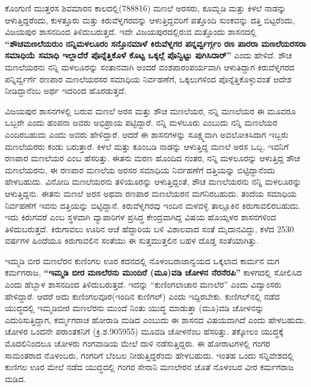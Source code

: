 ಕೊಂಗುಣಿ ಮುತ್ತರಸ ಶಿವಮಾರನ ಕಾಲದಲ್ಲಿ(788\enginline{-}816) ಮಣಲೆ ಅರಸರು, ಕೂಮ್ಬಡಿ ಮತ್ತು ಕಿಳಲೆ ನಾಡನ್ನು ಆಳುತ್ತಿದ್ದರೆಂದು, ಕುಳತ್ತೂರು ಮತ್ತು ಕಿರುವೆಳ್ನಗರವನ್ನು ಆಳುತ್ತಿದ್ದವರಿಗೆ ಪತ್ತೊಂದಿ ಸುಂಕವನ್ನು ದತ್ತಿ ಬಿಟ್ಟರೆಂದು, ವಿಜಯಪುರ ಶಾಸನದಿಂದ ತಿಳಿದುಬರುತ್ತದೆ. ಇದೇ ವಿಜಯಪುರದಲ್ಲಿರುವ ಮತ್ತೊಂದು ಶಾಸನದಲ್ಲಿ \textbf{“ಶೌಚಮಣಲೆಯರುಂ\general{\break } ನನ್ನಿಮಳಲೂರಂ ಸನ್ತೊನಮಾಳೆ ಕಿರುವೆಳ್ನಗರ ಪನ್ನರ್ವ್ವರ್ಗ್ಗಂ ರಣ ಪಾರರಾ ಮಣಲೆಯರಸರಾ ಸಮಾಧಿಯೆ ಸಮಾಧಿ ಇಲ್ಲಾದೆರೆ ಪೊನ್ನೆತ್ತಿಕೊಳೆ ಕೊಟ್ಟ ಒಕ್ಕಲ್ಗೆ ಪೊನ್ವಿಟ್ಟು ಪುಗಿಸಿದಾರ್​”} ಎಂದು ಹೇಳಿದೆ. ಶೌಚ ಮಣಲೆಯರನು ನನ್ನಿ ಮಳಲೂರನ್ನು ಸಂತಾನವಾಗಿ ಅಂದರೆ ವಂಶಪಾರಂಪರ್ಯವಾಗಿ ಆಳುತಿದ್ದಾಗ ಕಿರುವೆಳ್ನಗರದ ಪನ್ನಿರ್ವ್ವರ್ಗೆ ರಣಪಾರ ಮಣಲೆಯರಸರ ಸಮಾಧಿಯ ನಿರ್ವಹಣೆಗೆ, ಒಕ್ಕಲುಗಳಿಂದ ಪೊನ್ನೆತ್ತಿಕೊಳ್ಳುವಂತೆ ಆದೇಶ ನೀಡಿದ್ದಾನೆಂಬ ಅರ್ಥ ಇದರಿಂದ ಹೊರಡುತ್ತದೆ.

ವಿಜಯಪುರ ಶಾಸನಗಳಲ್ಲಿ ಬರುವ ಮಣಲೆ ಅರಸ ಮತ್ತು ಶೌಚ ಮಣಲೆಯರ, ನನ್ನಿ ಮಣಲೆಯರ ಈ ಮೂವರೂ ಒಬ್ಬರೇ ಎಂದು ಹಂಪನಾ ಅವರು ಅಭಿಪ್ರಾಯ ಪಟ್ಟಿದ್ದಾರೆ. ನನ್ನಿ ಮಳಲೂರು ಎಂಬುದು ನನ್ನಿ ಮಣಲೆಯರ ಎಂದಿರಬಹುದು ಎಂದು ಅವರು ಹೇಳಿದ್ದಾರೆ. ಆದರೆ ಈ ಶಾಸನಗಳನ್ನು ಸೂಕ್ಷ್ಮವಾಗಿ ಅವಲೋಕಿಸಿದಾಗ ಇಬ್ಬರು ಮಣಲೆಯರರು ಕಂಡು ಬರುತ್ತಾರೆ. ಕಿಳಲೆ ಮತ್ತು ಕೂಂಬಡಿ ನಾಡನ್ನು ಆಳುತ್ತಿದ್ದ ಮಣಲೆ ಅರಸ ಒಬ್ಬ. ಇವನಿಗೆ ರಣಪಾರ ಮಣಲೆಯರ ಎಂಬ ಹೆಸರಿತ್ತು. ಈತನು ಮರಣ ಹೊಂದಿದ ನಂತರ, ನನ್ನಿ ಮಳಲೂರನ್ನು ಆಳುತ್ತಿದ್ದ ಶೌಚ ಮಣಲೆಯರನು, ಈ ರಣಪಾರ ಮಣಲೆಯ ಅರಸರ ಸಮಾಧಿಯ ನಿರ್ವಹಣೆಗೆ ದತ್ತಿಯನ್ನು ಬಿಟ್ಟಿದ್ದಾನೆಂದು ಹೇಳಬಹುದು. ವಿನೋದಿ ಮಣಲೆಯರನು ತಳಿಯೂರನ್ನು ಆಳುತ್ತಿದ್ದಂತೆ, ಶೌಚ ಮಣಲೆಯರನು ನನ್ನಿ ಮಳಲೂರನ್ನು ಆಳುತ್ತಿದ್ದನು. ಈತನು ಮಣಲೆ ಅರಸ ಅಥವಾ ರಣಪಾರ ಮಣಲೆಯರನ ಮಗನಿರಬಹುದು. ತಂದೆಯ ಸಮಾಧಿಯ ನಿರ್ವಹಣೆಗೆ ಇವನು ದತ್ತಿಯನ್ನು ಬಿಟ್ಟಿದ್ದಾನೆ. ಕಿರುವೆಳ್ನಗರವು ಇಂದಿನ ಮಳವಳ್ಳಿ ತಾಲ್ಲೂಕಿನ ಕಿರುಗಾವಲಿರಬಹುದು. ಇದು ಕಿರುಗವರೆ ಎಂಬ ಸ್ಥಳವಾಗಿ ವ್ಯಾಪಾರಿಗಳ ಪ್ರಸಿದ್ಧ ಕೇಂದ್ರವಾಗಿದ್ದ ವಿಷಯ ಹೊಯ್ಸಳರ ಶಾಸನಗಳಿಂದ ತಿಳಿದುಬರುತ್ತದೆ. ಕಿರುಗಾವಲು ಊರಿನ ಆಚೆ ಹೆದ್ದಾರಿಯ ಬಳಿ ವಿಶಾಲವಾದ ಸಂತೆ ಮೈದಾನವಿದ್ದು, ಕಳೆದ 25\enginline{-}30 ವರ್ಷಗಳ ಹಿಂದೆಯೂ ಕಿರುಗಾವಲಿನ ಸಂತೆಯು ಈ ಸುತ್ತಮುತ್ತಲಿನ ಬಹಳ ದೊಡ್ಡ ಸಂತೆಯಾಗಿತ್ತು.

ಇಮ್ಮಡಿ ಬೀರ ಮಣಲೆರನ ಕುಣಿಂಗಲ ಊರ ಕದನದಲ್ಲಿ ನೊಳಂಬರಾಜಾನ್ವಯದ ಒಕ್ಕಲಾದ ಕಾರ್ಮನ ಮಗ ಕರ್ಮಗರಾಜ, \textbf{“ಇಮ್ಮಡಿ ಬೀರ ಮಣಲೆರನು ಮುಂದಿರೆ (ಮೂ)ವಡಿ ಚೋಳನ ನೆರನೆರಪಿ”} ಕಾಳಗದಲ್ಲಿ ಸೋಲಿಸಿದ ಎಂದು ಹೆಬ್ಬಾಳ ಶಾಸನದಿಂದ ತಿಳಿದುಬರುತ್ತದೆ. ಇದನ್ನು “ಕುಣಿಂಗಲಾಚಾರ ಮಣಲೆರ” ಎಂದು ವಿದ್ವಾಂಸರು ಹೇಳಿದ್ದಾರೆ. ಆದರೆ ಅದು ಕುಣಿಂಗಲವೂರ(ಇಂದಿನ ಕುಣಿಗಲ್​) ಎಂದು ಇದ್ದಿರಬೇಕು. ಕುಣಿಗಲ್​ನಲ್ಲಿ ನಡೆದ ಯುದ್ಧದಲ್ಲಿ ಇಮ್ಮಡಿಬೀರ ಮಣಲೆರನು ಮುಂದೆ ನಿಂತು ಯುದ್ಧ ಮಾಡುತ್ತಾ (ಮೂ)ವಡಿ ಚೋಳನನ್ನು ಎದುರಿಸುತ್ತಿದ್ದಾಗ, ಕರ್ಮ್ಮಗರಾಚ ಹೋರಾಡಿ ಮಡಿದ ಎಂಬುದು ಈ ಶಾಸನದ ವಿಷಯವಾಗಿದೆ ಎಂದು ಹೇಳಬಹುದು. ಚೋಳರ ಒಂದನೇ ಪರಾಂತಕನಿಗೆ (ಕ್ರಿ.ಶ.905\enginline{-}955) ಮೂವಡಿ ಚೋಳನೆಂಬ ಹೆಸರಿತ್ತು. ತಕ್ಕೋಲಂ ಯುದ್ಧಕ್ಕೆ ಮೊದಲಿನಿಂದಲೂ ಚೋಳರು ಗಂಗವಾಡಿಯ ಮೇಲೆ ದಾಳಿ ನಡೆಸುತ್ತಿದ್ದರು. ಈ ಹೋರಾಟಗಳಲ್ಲಿ ಗಂಗರ ಸಾಮಂತರಾದ ನೊಳಂಬರು, ಗಂಗರಿಗೆ ಬೆಂಬಲ ನೀಡುತ್ತಿದ್ದರೆಂದು ಹೇಳಬಹುದು. ಇಂತಹ ಒಂದು ಸನ್ನಿವೇಶದಲ್ಲಿ ಕುಣಿಗಲ ಊರ ಮೇಲೆ ನಡೆದ ಯುದ್ಧದಲ್ಲಿ ಗಂಗರ ಸೇನಾನಿ ಮಣಲೇರನ ಜೊತೆ ನೊಳಂಬರ ವೀರ ಕರ್ಮಗರಾಜ ಮಡಿದ.

